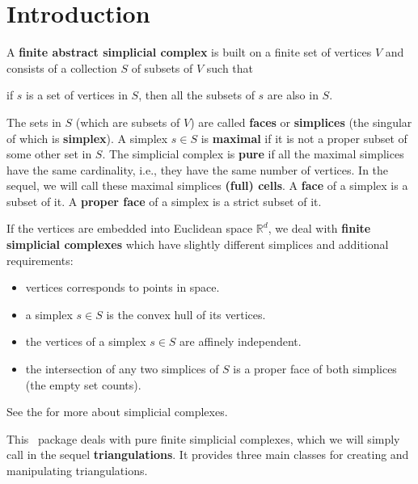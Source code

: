 
\newcommand{\note}[1]{\begin{ccTexOnly}%
{\color{red}$\langle\!\langle$#1$\rangle\!\rangle$}\end{ccTexOnly}}
\newcommand{\sphere}{\ensuremath{\mathcal S}}
\renewcommand{\real}{\ensuremath{\mathbb R}}

\section{Introduction\label{triangulation:intro}}

A \textbf{finite abstract simplicial complex} is built on a finite set of
vertices $V$ and consists of a collection $S$ of subsets of $V$ such that

\centerline{if $s$ is a set of vertices in $S$, then all the subsets of $s$ are also
in $S$.}

The sets in $S$ (which are subsets of $V$) are called
\textbf{faces} or \textbf{simplices} (the
singular of which is \textbf{simplex}).
%
A simplex $s\in S$ is \textbf{maximal} if it is not a proper subset of some other
set in $S$. The simplicial complex is \textbf{pure} %
if all the maximal simplices have the same cardinality, i.e., they have the same
number of vertices. 
In the sequel, we will call these maximal simplices \textbf{(full) cells}.
A \textbf{face} of a simplex is a subset of it.
A \textbf{proper face} of a simplex is a strict subset of it.

If the vertices are embedded into Euclidean space $\real^d$, we deal with
\textbf{finite simplicial complexes} which have slightly different simplices
and additional requirements:
\begin{itemize}
\item vertices corresponds to points in space.
\item a simplex $s\in S$ is the convex hull of its vertices.
\item the vertices of a simplex $s\in S$ are affinely independent.
\item the intersection of any two simplices of $S$ is a proper face of both
simplices (the empty set counts).
\end{itemize}
See the  for more about simplicial complexes.

This \cgal\ package deals with pure finite simplicial complexes, which
we will simply call in the sequel \textbf{triangulations}. It provides three main classes
for creating and manipulating triangulations.

